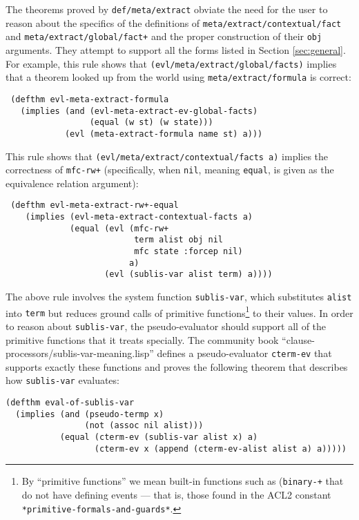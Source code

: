 The theorems proved by \texttt{def\-/meta\-/extract} obviate the need for the user to reason about
the specifics of the definitions of
\texttt{meta\-/extract\-/contextual\-/fact} and
\texttt{meta\-/extract\-/global\-/fact+} and the proper construction
of their \texttt{obj} arguments.  They attempt to support
all the forms listed in Section \ref{sec:general}.  For example, this rule shows that
\texttt{(evl\-/meta\-/extract\-/global\-/facts)} implies that a theorem looked
up from the world using \texttt{meta\-/extract\-/formula} is correct:
\begin{verbatim}
 (defthm evl-meta-extract-formula
   (implies (and (evl-meta-extract-ev-global-facts)
                 (equal (w st) (w state)))
            (evl (meta-extract-formula name st) a)))

\end{verbatim}
This rule shows that
\texttt{(evl\-/meta\-/extract\-/contextual\-/facts a)} implies the correctness
of \texttt{mfc-rw+} (specifically, when \texttt{nil}, meaning
\texttt{equal}, is given as the equivalence relation argument):
\begin{verbatim}
 (defthm evl-meta-extract-rw+-equal
    (implies (evl-meta-extract-contextual-facts a)
             (equal (evl (mfc-rw+
                          term alist obj nil
                          mfc state :forcep nil)
                         a)
                    (evl (sublis-var alist term) a))))
\end{verbatim}
The above rule involves the system function {\tt sublis-var}, which
substitutes {\tt alist} into {\tt term} but reduces ground calls of
primitive functions\footnote{By ``primitive functions'' we mean
  built-in functions such as ({\tt binary-+} that do not have defining
  events --- that is, those found in the ACL2 constant {\tt
    *primitive-formals-and-guards*}.} to their values.  In order to
reason about {\tt sublis-var}, the pseudo-evaluator should support all of
the primitive functions that it treats specially.  The community book
``clause-processors/sublis-var-meaning.lisp'' defines a
pseudo-evaluator {\tt cterm-ev} that supports exactly these functions
and proves the following theorem that describes how {\tt sublis-var}
evaluates:
\begin{verbatim}
(defthm eval-of-sublis-var
  (implies (and (pseudo-termp x)
                (not (assoc nil alist)))
           (equal (cterm-ev (sublis-var alist x) a)
                  (cterm-ev x (append (cterm-ev-alist alist a) a)))))
\end{verbatim}

